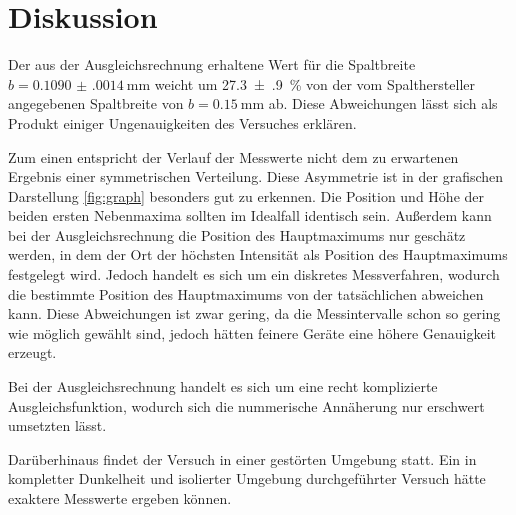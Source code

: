 \section{Diskussion}
\label{sec:Diskussion}
Der aus der Ausgleichsrechnung erhaltene Wert für die Spaltbreite $b = \SI{0.1090(0014)}{\milli\meter}$ weicht um \SI{27.3(9)}{\percent} von der vom Spalthersteller angegebenen Spaltbreite von $b = \SI{0.15}{\milli\meter}$ ab. Diese Abweichungen lässt sich als Produkt einiger Ungenauigkeiten des Versuches erklären. 

Zum einen entspricht der Verlauf der Messwerte nicht dem zu erwartenen Ergebnis einer symmetrischen Verteilung. Diese Asymmetrie ist in der grafischen Darstellung \ref{fig:graph} besonders gut zu erkennen. Die Position und Höhe der beiden ersten Nebenmaxima sollten im Idealfall identisch sein. Außerdem kann bei der Ausgleichsrechnung die Position des Hauptmaximums nur geschätz werden, in dem der Ort der höchsten Intensität als Position des Hauptmaximums festgelegt wird. Jedoch handelt es sich um ein diskretes Messverfahren, wodurch die bestimmte Position des Hauptmaximums von der tatsächlichen abweichen kann. Diese Abweichungen ist zwar gering, da die Messintervalle schon so gering wie möglich gewählt sind, jedoch hätten feinere Geräte eine höhere Genauigkeit erzeugt. 

Bei der Ausgleichsrechnung handelt es sich um eine recht komplizierte Ausgleichsfunktion, wodurch sich die nummerische Annäherung nur erschwert umsetzten lässt. 

Darüberhinaus findet der Versuch in einer gestörten Umgebung statt. Ein in kompletter Dunkelheit und isolierter Umgebung durchgeführter Versuch hätte exaktere Messwerte ergeben können.


